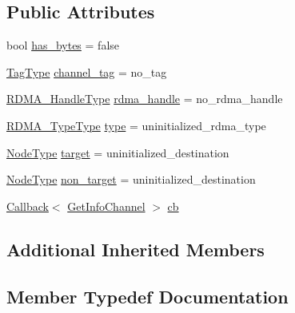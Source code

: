 \subsection*{Public Attributes}
\begin{DoxyCompactItemize}
\item 
bool \hyperlink{structvt_1_1rdma_1_1_create_channel_a614a55f5519b9367c6a2d70561552cc2}{has\+\_\+bytes} = false
\item 
\hyperlink{namespacevt_a84ab281dae04a52a4b243d6bf62d0e52}{Tag\+Type} \hyperlink{structvt_1_1rdma_1_1_create_channel_a8d17a858ee1c432e723237c359e695e4}{channel\+\_\+tag} = no\+\_\+tag
\item 
\hyperlink{namespacevt_a10442579ec4e7ebef223818e64bcf908}{R\+D\+M\+A\+\_\+\+Handle\+Type} \hyperlink{structvt_1_1rdma_1_1_create_channel_a27cb16b5aedbf0f2a905dc61fd89d783}{rdma\+\_\+handle} = no\+\_\+rdma\+\_\+handle
\item 
\hyperlink{namespacevt_1_1rdma_ac848e1d9da43db6294bd06f83e5d3946}{R\+D\+M\+A\+\_\+\+Type\+Type} \hyperlink{structvt_1_1rdma_1_1_create_channel_a69ed66b06ab210ac3db0c17e76d11c19}{type} = uninitialized\+\_\+rdma\+\_\+type
\item 
\hyperlink{namespacevt_a866da9d0efc19c0a1ce79e9e492f47e2}{Node\+Type} \hyperlink{structvt_1_1rdma_1_1_create_channel_ad562afaf95db8f77426f698b207de63f}{target} = uninitialized\+\_\+destination
\item 
\hyperlink{namespacevt_a866da9d0efc19c0a1ce79e9e492f47e2}{Node\+Type} \hyperlink{structvt_1_1rdma_1_1_create_channel_aca4aa45ce8f62e0f4ae02c0ea2c9428c}{non\+\_\+target} = uninitialized\+\_\+destination
\item 
\hyperlink{namespacevt_a57b238783d05de96bc2c4027f7073b7f}{Callback}$<$ \hyperlink{structvt_1_1rdma_1_1_get_info_channel}{Get\+Info\+Channel} $>$ \hyperlink{structvt_1_1rdma_1_1_create_channel_a0672669be0eb2cb8cf293e60a88af2ad}{cb}
\end{DoxyCompactItemize}
\subsection*{Additional Inherited Members}


\subsection{Member Typedef Documentation}
\mbox{\label{structvt_1_1rdma_1_1_create_channel_ae16004f4d4886e470c8e896fca551afd}} 
